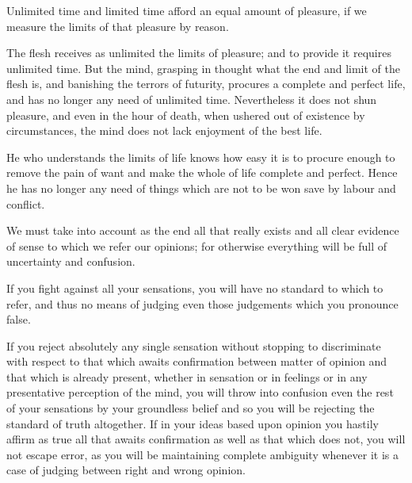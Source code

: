 \documentclass{stex}
\begin{document}
\vspace{0.5em}
\begin{sparagraph}[title=19]
  Unlimited time and limited time afford an equal amount of pleasure, if we measure the limits of that pleasure by reason.
\end{sparagraph}

\vspace{0.5em}
\begin{sparagraph}[title=20]
  The flesh receives as unlimited the limits of pleasure; and to provide it requires unlimited time.
  But the mind, grasping in thought what the end and limit of the flesh is, and banishing the terrors of futurity, procures a complete and perfect life, and has no longer any need of unlimited time.
  Nevertheless it does not shun pleasure, and even in the hour of death, when ushered out of existence by circumstances, the mind does not lack enjoyment of the best life.
\end{sparagraph}

\vspace{0.5em}
\begin{sparagraph}[title=21]
  He who understands the limits of life knows how easy it is to procure enough to remove the pain of want and make the whole of life complete and perfect.
  Hence he has no longer any need of things which are not to be won save by labour and conflict.
\end{sparagraph}

\vspace{0.5em}
\begin{sparagraph}[title=22]
  We must take into account as the end all that really exists and all clear evidence of sense to which we refer our opinions; for otherwise everything will be full of uncertainty and confusion.
\end{sparagraph}

\vspace{0.5em}
\begin{sparagraph}[title=23]
  If you fight against all your sensations, you will have no standard to which to refer, and thus no means of judging even those judgements which you pronounce false.
\end{sparagraph}

\vspace{0.5em}
\begin{sparagraph}[title=24]
  If you reject absolutely any single sensation without stopping to discriminate with respect to that which awaits confirmation between matter of opinion and that which is already present, whether in sensation or in feelings or in any presentative perception of the mind, you will throw into confusion even the rest of your sensations by your groundless belief and so you will be rejecting the standard of truth altogether.
  If in your ideas based upon opinion you hastily affirm as true all that awaits confirmation as well as that which does not, you will not escape error, as you will be maintaining complete ambiguity whenever it is a case of judging between right and wrong opinion.
\end{sparagraph}
\end{document}
